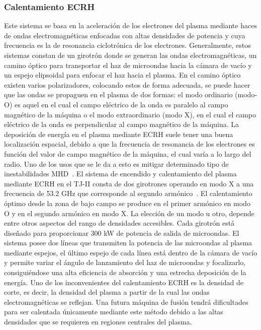 \subsubsection*{Calentamiento ECRH}
Este sistema se basa en
la aceleración de los electrones del plasma mediante haces de ondas electromagnéticas enfocadas
con altas densidades de potencia y cuya frecuencia es la de resonancia ciclotrónica de
los electrones.
Generalmente, estos sistemas constan de un girotrón donde se generan las ondas electromagnéticas, 
un camino óptico para transportar el haz de microondas hacia la cámara de
vacío y un espejo elipsoidal para enfocar el haz hacia el plasma.
En el camino óptico existen varios polarizadores, colocando estos de forma adecuada, se puede hacer que las ondas se propaguen
en el plasma de dos formas: el modo ordinario (modo-O) es aquel en el cual el campo
eléctrico de la onda es paralelo al campo magnético de la máquina o el modo extraordinario
(modo X), en el cual el campo eléctrico de la onda es perpendicular al campo magnético de
la máquina. La deposición de energía en el plasma mediante ECRH suele tener una buena localización
espacial, debido a que la frecuencia de resonancia de los electrones es función del valor de
campo magnético de la máquina, el cual varía a lo largo del radio. Uno de los usos que se le
da a esto es mitigar determinado
tipo de inestabilidades MHD~\cite{van_den_Brand_2012}.
El sistema de encendido y calentamiento del plasma mediante ECRH en el TJ-II consta de
dos girotrones operando en modo X a una frecuencia de 53.2 GHz que corresponde al segundo
armónico~\cite{Fernandez2001}. El calentamiento óptimo desde la zona de bajo campo se produce en el
primer armónico en modo O y en el segundo armónico en modo X. La elección de un modo
u otro, depende entre otros aspectos del rango de densidades accesibles. Cada girotrón está diseñado
para proporcionar 300 kW de potencia de salida de microondas. El sistema posee dos líneas
que transmiten la potencia de las microondas al plasma mediante espejos, el último espejo
de cada línea está dentro de la cámara de vacío y permite variar el ángulo de lanzamiento
del haz de microondas y focalizarlo, consiguiéndose una alta eficiencia de absorción y una
estrecha deposición de la energía.
Uno de los inconvenientes del calentamiento ECRH es la densidad de corte, es decir, la densidad
del plasma a partir de la cual las ondas electromagnéticas se reflejan. Una futura máquina
de fusión tendrá dificultades para ser calentada únicamente mediante este método debido a
las altas densidades que se requieren en regiones centrales del plasma.
